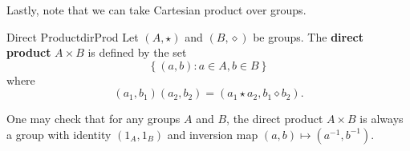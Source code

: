 \documentclass[math]{amznotes}
\theoremstyle{remark}
\newcommand{\0}{\mathbf{0}}
\newcommand{\1}{\mathbf{1}}
\begin{document}
Lastly, note that we can take Cartesian product over groups.
\begin{dfnbox}{Direct Product}{dirProd}
    Let $(A, \star)$ and $(B, \diamond)$ be groups. The {\color{red} \textbf{direct product}} $A \times B$ is defined by the set
    \begin{equation*}
        \left\{\left(a, b\right) \colon a \in A, b \in B\right\}
    \end{equation*}
    where
    \begin{equation*}
        \left(a_1, b_1\right)\left(a_2, b_2\right) = \left(a_1 \star a_2, b_1 \diamond b_2\right).
    \end{equation*}
\end{dfnbox}
One may check that for  any groups $A$ and $B$, the direct product $A \times B$ is always a group with identity $\left(1_A, 1_B\right)$ and inversion map $\left(a, b\right) \mapsto \left(a^{-1}, b^{-1}\right)$.
\end{document}
